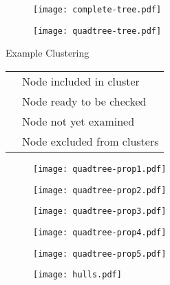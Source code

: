 \documentclass{beamer}
\begin{document}
\begin{frame}
	\begin{figure}
		\texttt{[image: complete-tree.pdf]}
	\end{figure}
\end{frame}

\begin{frame}
	\begin{figure}
		\texttt{[image: quadtree-tree.pdf]}
	\end{figure}
\end{frame}

\begin{frame}{Example Clustering}
	\begin{table}
		\begin{tabular}{l l}
			\cellcolor{lred}   & Node included in cluster \\
			\cellcolor{lblue}  & Node ready to be checked \\
			\phantom{one}      & Node not yet examined \\
			\cellcolor{silver} & Node excluded from clusters \\
		\end{tabular}
	\end{table}
\end{frame}

\begin{frame}
	\begin{figure}
		\texttt{[image: quadtree-prop1.pdf]}
	\end{figure}
\end{frame}

\begin{frame}
	\begin{figure}
		\texttt{[image: quadtree-prop2.pdf]}
	\end{figure}
\end{frame}

\begin{frame}
	\begin{figure}
		\texttt{[image: quadtree-prop3.pdf]}
	\end{figure}
\end{frame}

\begin{frame}
	\begin{figure}
		\texttt{[image: quadtree-prop4.pdf]}
	\end{figure}
\end{frame}

\begin{frame}
	\begin{figure}
		\texttt{[image: quadtree-prop5.pdf]}
	\end{figure}
\end{frame}

\begin{frame}
	\begin{figure}
		\texttt{[image: hulls.pdf]}
	\end{figure}
\end{frame}

\begin{frame}
\end{frame}
\end{document}
